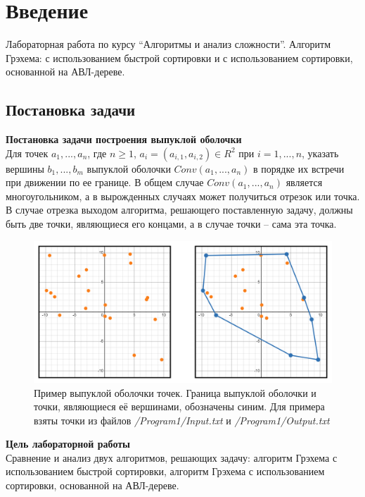 \section{Введение}
Лабораторная работа по курсу \textquotedblleft{}Алгоритмы и анализ сложности\textquotedblright{}. Алгоритм Грэхема: с использованием быстрой сортировки и с использованием сортировки, основанной на АВЛ-дереве.

\subsection{Постановка задачи}

\noindent \textbf{Постановка задачи построения выпуклой оболочки}\\
\indent Для точек $a_1, ..., a_n$, где $n\geq1$, $a_i=(a_{i,1},a_{i,2})\in R^2$ при $i=1,...,n$, указать вершины $b_1,...,b_m$ выпуклой оболочки $Conv(a_1,...,a_n)$ в порядке их встречи при движении по ее границе. В общем случае $Conv(a_1,...,a_n)$ является многоугольником, а в вырожденных случаях может получиться отрезок или точка. В случае отрезка выходом алгоритма, решающего поставленную задачу, должны быть две точки, являющиеся его концами, а в случае точки -- сама эта точка.

\begin{figure}[h]
	\centering
	\includegraphics[width=\textwidth]{Images/convex_hull_example.png}
	\caption{Пример выпуклой оболочки точек. Граница выпуклой оболочки и точки, являющиеся её вершинами, обозначены синим. Для примера взяты точки из файлов \textsl{/Program1/Input.txt} и \textsl{/Program1/Output.txt}}
	\label{fig:convex_hull_example}
\end{figure}

\noindent \textbf{Цель лабораторной работы}\\
\indent Сравнение и анализ двух алгоритмов, решающих задачу: алгоритм Грэхема с использованием быстрой сортировки, алгоритм Грэхема с использованием сортировки, основанной на АВЛ-дереве.

